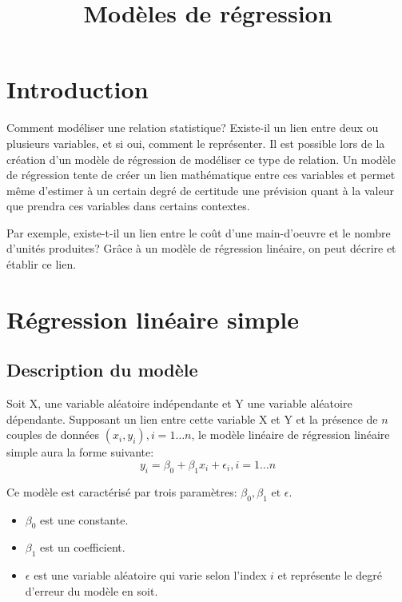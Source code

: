 \documentclass[12pt]{book}
\title{Modèles de régression}
\theoremstyle{definition}
\begin{document}
\chapter{Introduction}
Comment modéliser une relation statistique? Existe-il un lien entre deux ou plusieurs variables, et si oui, comment
le représenter. Il est possible lors de la création d'un modèle de régression de modéliser ce type de relation. Un modèle de régression tente de créer un lien mathématique entre ces 
variables et permet même d'estimer à un certain degré de certitude une prévision quant à la valeur que prendra ces 
variables dans certains contextes.

Par exemple, existe-t-il un lien entre le coût d'une main-d'oeuvre et le nombre d'unités produites? Grâce à un modèle de régression
linéaire, on peut décrire et établir ce lien.

\chapter{Régression linéaire simple}
\section{Description du modèle}
Soit X, une variable aléatoire indépendante et Y une variable aléatoire dépendante. Supposant un lien entre cette variable X et Y 
et la présence de $n$ couples de données $(x_i, y_i), i=1 \dots n$, le modèle linéaire de régression linéaire simple aura la forme 
suivante:
$$ y_i = \beta_0 + \beta_1 x_i + \epsilon_i, i=1 \dots n $$ 


Ce modèle est caractérisé par trois paramètres: $\beta_0, \beta_1 \text{ et } \epsilon$.

\begin{itemize}
    \item $\beta_0$ est une constante.
    \item $\beta_1$ est un coefficient.
    \item $\epsilon$ est une variable aléatoire qui varie selon l'index $i$ et représente le degré d'erreur du modèle en soit.
\end{itemize}
\end{document}
